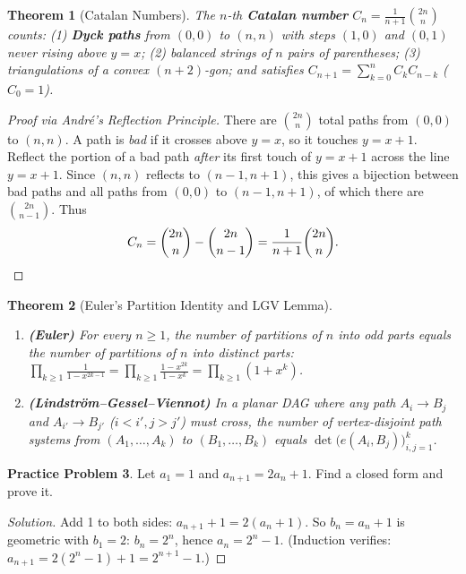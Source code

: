 \documentclass[11pt]{article}
\theoremstyle{plain}
\newtheorem{theorem}{Theorem}[section]
\theoremstyle{definition}
\newtheorem{problem}[theorem]{Practice Problem}
\newenvironment{solution}{\begin{proof}[Solution]}{\end{proof}}
\begin{document}
\begin{theorem}[Catalan Numbers]
The $n$-th \textbf{Catalan number} $C_n = \frac{1}{n+1}\binom{2n}{n}$ counts:
(1) \textbf{Dyck paths} from $(0,0)$ to $(n,n)$ with steps $(1,0)$ and $(0,1)$ never rising above $y=x$;
(2) balanced strings of $n$ pairs of parentheses;
(3) triangulations of a convex $(n+2)$-gon;
and satisfies $C_{n+1} = \sum_{k=0}^n C_k C_{n-k}$ ($C_0=1$).
\end{theorem}
\begin{proof}[Proof via André's Reflection Principle]
There are $\binom{2n}{n}$ total paths from $(0,0)$ to $(n,n)$. A path is \emph{bad} if it crosses above $y=x$, so it touches $y = x+1$. Reflect the portion of a bad path \emph{after} its first touch of $y = x+1$ across the line $y = x+1$. Since $(n,n)$ reflects to $(n-1,n+1)$, this gives a bijection between bad paths and all paths from $(0,0)$ to $(n-1,n+1)$, of which there are $\binom{2n}{n-1}$. Thus
\[
C_n = \binom{2n}{n} - \binom{2n}{n-1} = \frac{1}{n+1}\binom{2n}{n}. \qedhere
\]
\end{proof}

\begin{theorem}[Euler's Partition Identity and LGV Lemma]
\leavevmode
\begin{enumerate}[label=(\alph*)]
\item \textbf{(Euler)} For every $n \ge 1$, the number of partitions of $n$ into \emph{odd} parts equals the number of partitions of $n$ into \emph{distinct} parts: $\prod_{k\ge 1}\frac{1}{1-x^{2k-1}} = \prod_{k\ge 1}\frac{1-x^{2k}}{1-x^k} = \prod_{k\ge 1}(1+x^k)$.
\item \textbf{(Lindström--Gessel--Viennot)} In a planar DAG where any path $A_i \to B_j$ and $A_{i'} \to B_{j'}$ ($i<i', j>j'$) must cross, the number of vertex-disjoint path systems from $(A_1,\dots,A_k)$ to $(B_1,\dots,B_k)$ equals $\det\bigl(e(A_i, B_j)\bigr)_{i,j=1}^k$.
\end{enumerate}
\end{theorem}

\begin{problem}
Let $a_1 = 1$ and $a_{n+1} = 2a_n + 1$. Find a closed form and prove it.
\end{problem}
\begin{solution}
Add 1 to both sides: $a_{n+1}+1 = 2(a_n + 1)$. So $b_n = a_n+1$ is geometric
with $b_1 = 2$: $b_n = 2^n$, hence $a_n = 2^n - 1$. (Induction verifies:
$a_{n+1} = 2(2^n-1)+1 = 2^{n+1}-1$.)
\end{solution}
\end{document}
